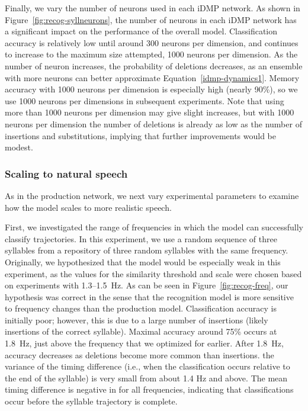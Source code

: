 Finally, we vary the number of neurons
used in each iDMP network.
As shown in Figure~\ref{fig:recog-syllneurons},
the number of neurons in each iDMP network
has a significant impact on the performance
of the overall model.
Classification accuracy is relatively low
until around 300 neurons per dimension,
and continues to increase
to the maximum size attempted,
1000 neurons per dimension.
As the number of neuron increases,
the probability of deletions decreases,
as an ensemble with more neurons
can better approximate Equation~\eqref{idmp-dynamics1}.
Memory accuracy with 1000 neurons per dimension
is especially high (nearly 90\%),
so we use 1000 neurons per dimensions
in subsequent experiments.
Note that using more than 1000 neurons per dimension
may give slight increases,
but with 1000 neurons per dimension
the number of deletions is already
as low as the number of insertions
and substitutions,
implying that further improvements
would be modest.

\subsubsection{Scaling to natural speech}

As in the production network,
we next vary experimental parameters
to examine how the model scales
to more realistic speech.


First, we investigated the
range of frequencies in which the model
can successfully classify trajectories.
In this experiment, we use a random sequence
of three syllables from a
repository of three random syllables
with the same frequency.
Originally, we hypothesized that the
model would be especially weak in this experiment,
as the values for the similarity threshold
and scale were chosen based on
experiments with 1.3--1.5~Hz.
As can be seen in Figure~\ref{fig:recog-freq},
our hypothesis was correct in the sense that
the recognition model
is more sensitive to frequency changes
than the production model.
Classification accuracy is initially poor;
however, this is due to a large number
of insertions
(likely insertions of the correct syllable).
Maximal accuracy around 75\%
occurs at 1.8~Hz,
just above the frequency that we
optimized for earlier.
After 1.8~Hz, accuracy decreases
as deletions become more common
than insertions.
the variance of the timing difference
(i.e., when the classification occurs
relative to the end of the syllable)
is very small from about 1.4 Hz and above.
The mean timing difference
is negative in for all frequencies,
indicating that classifications
occur before the syllable trajectory
is complete.


